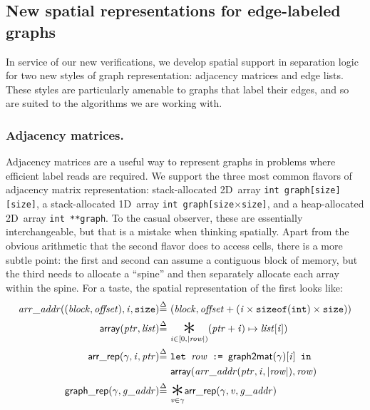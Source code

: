 \subsection{New spatial representations for edge-labeled graphs}

In service of our new verifications, we develop spatial support in separation 
logic for two new styles of graph representation:
adjacency matrices and edge lists. These styles are particularly
amenable to graphs that label their edges, and so are suited to
the algorithms we are working with.


\subsubsection{Adjacency matrices.}

Adjacency matrices are a useful way to represent graphs
in problems where efficient label reads are required. 
We support the three most common 
flavors of adjacency matrix representation:
stack-allocated 2D~array \texttt{int~graph[size][size]},
a stack-allocated 1D~array \texttt{int~graph[size$\times$size]}, 
and a heap-allocated 2D~array \texttt{int~**graph}. 
To the casual observer, these are essentially interchangeable, but 
that is a mistake when thinking spatially. Apart from the obvious 
arithmetic that the second flavor does to access cells, there is a 
more subtle point: the first and second can
assume a contiguous block of memory, but the third needs to allocate
a ``spine'' and then separately allocate each array within the spine.
For a taste, the spatial representation of the first looks like:
\vspace{-0.5em}
\begin{equation*}
\begin{split}
\m{arr\_addr} ((\m{block}, \m{offset}), \m{i},\texttt{size}) \defeq~&
  (\m{block}, \m{offset} + (\m{i} \times \texttt{sizeof}(\texttt{int}) \times \texttt{size})) \\
\mathsf{array}(\m{ptr},\m{list}) \defeq~& \underset{\m{i} \in [0, \lvert\m{row}\rvert)}{\bigstar} (\m{ptr} + \m{i}) \mapsto \m{list}[\m{i}]) \\
\p{arr\_rep}(\gamma, \m{i}, \m{ptr}) \defeq~& \texttt{let }\m{row} \texttt{ := }\mathsf{graph2mat}(\gamma)[\m{i}] \texttt{ in } \\
&\mathsf{array}(\m{arr\_addr}(\m{ptr},\m{i},\lvert\m{row}\rvert), \m{row}) \\
\vspace{1em}
\p{graph\_rep}(\gamma, \m{g\_addr}) \defeq~& \underset{\m{v} \in \gamma}{\bigstar} \p{arr\_rep}(\gamma, \m{v}, \m{g\_addr})
\end{split}
\end{equation*}
